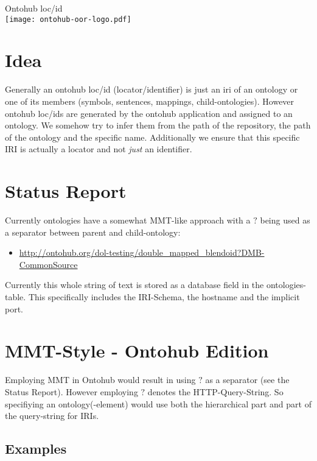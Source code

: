 \documentclass[a4paper,11pt,DIV=25]{scrartcl}
\author{Tim Reddehase}
\date{2014-09-09}
\begin{document}
\Huge
\begin{center}
  Ontohub loc/id\\
  \bigskip
  \texttt{[image: ontohub-oor-logo.pdf]}
\end{center}
\normalsize

\bigskip

\section{Idea}

Generally an ontohub loc/id (locator/identifier) is just an iri of an ontology
or one of its members (symbols, sentences, mappings, child-ontologies). However
ontohub loc/ids are generated by the ontohub application and assigned to an
ontology.  We somehow try to infer them from the path of the repository, the
path of the ontology and the specific name. Additionally we ensure that this
specific IRI is actually a locator and not \textit{just} an identifier.

\section{Status Report}

Currently ontologies have a somewhat MMT-like approach with a $?$ being used as
a separator between parent and child-ontology:

\begin{itemize}
  \item \url{http://ontohub.org/dol-testing/double_mapped_blendoid?DMB-CommonSource}
\end{itemize}

Currently this whole string of text is stored as a database field in the
ontologies-table.  This specifically includes the IRI-Schema, the hostname and
the implicit port.

\section{MMT-Style - Ontohub Edition}

Employing MMT in Ontohub would result in using $?$ as a separator (see the
Status Report).  However employing $?$ denotes the HTTP-Query-String. So
specifiying an ontology(-element) would use both the hierarchical part and part
of the query-string for IRIs.

\subsection{Examples}
\end{document}
